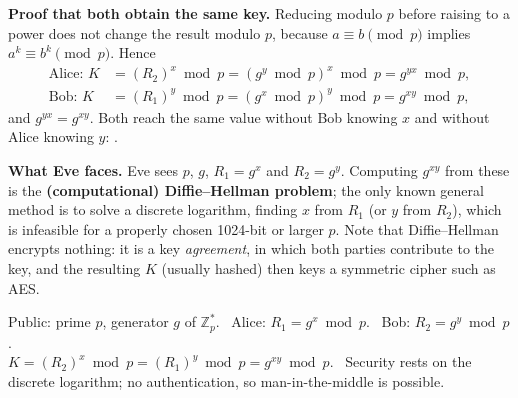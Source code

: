 \textbf{Proof that both obtain the same key.} Reducing modulo $p$ before raising to a power does not change the result modulo $p$, because $a \equiv b \pmod p$ implies $a^k \equiv b^k \pmod p$. Hence
\begin{align*}
\text{Alice: } K &= (R_2)^x \bmod p = (g^y \bmod p)^x \bmod p = g^{yx} \bmod p,\\
\text{Bob: } K &= (R_1)^y \bmod p = (g^x \bmod p)^y \bmod p = g^{xy} \bmod p ,
\end{align*}
and $g^{yx} = g^{xy}$. Both reach the same value without Bob knowing $x$ and without Alice knowing $y$: .

\textbf{What Eve faces.} Eve sees $p$, $g$, $R_1 = g^x$ and $R_2 = g^y$. Computing $g^{xy}$ from these is the \textbf{(computational) Diffie--Hellman problem}; the only known general method is to solve a discrete logarithm, finding $x$ from $R_1$ (or $y$ from $R_2$), which is infeasible for a properly chosen 1024-bit or larger $p$. Note that Diffie--Hellman encrypts nothing: it is a key \emph{agreement}, in which both parties contribute to the key, and the resulting $K$ (usually hashed) then keys a symmetric cipher such as AES.

\begin{mustknow}
Public: prime $p$, generator $g$ of $\mathbb{Z}_p^*$. \ Alice: $R_1 = g^x \bmod p$. \ Bob: $R_2 = g^y \bmod p$.\\
$K = (R_2)^x \bmod p = (R_1)^y \bmod p = g^{xy} \bmod p$. \ Security rests on the discrete logarithm; no authentication, so man-in-the-middle is possible.
\end{mustknow}

